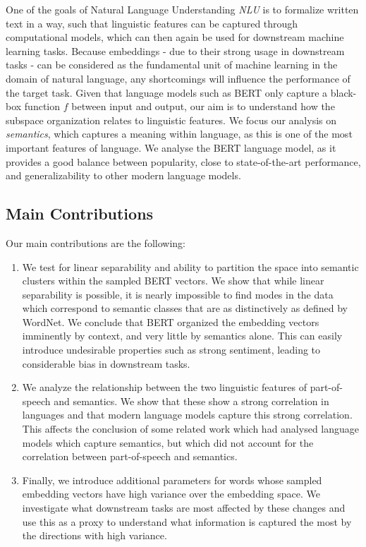 \documentclass[a4paper,12pt,twoside,openright]{report}
\begin{document}
One of the goals of Natural Language Understanding \textit{NLU} is to formalize written text in a way, such that linguistic features can be captured through computational models, which can then again be used for downstream machine learning tasks.
Because embeddings - due to their strong usage in downstream tasks - can be considered as the fundamental unit of machine learning in the domain of natural language, any shortcomings will influence the performance of the target task.
Given that language models such as BERT only capture a black-box function $f$ between input and output, our aim is to understand how the subspace organization relates to linguistic features.
We focus our analysis on \textit{semantics}, which captures a meaning within language, as this is one of the most important features of language. 
We analyse the BERT language model, as it provides a good balance between popularity, close to state-of-the-art performance, and generalizability to other modern language models.
\\

\subsection{Main Contributions}

Our main contributions are the following: 

\begin{enumerate}
\item We test for linear separability and ability to partition the space into semantic clusters within the sampled BERT vectors.
We show that while linear separability is possible, it is nearly impossible to find modes in the data which correspond to semantic classes that are as distinctively as defined by WordNet.
We conclude that BERT organized the embedding vectors imminently by context, and very little by semantics alone.
This can easily introduce undesirable properties such as strong sentiment, leading to considerable bias in downstream tasks.
\item We analyze the relationship between the two linguistic features of part-of-speech and semantics. 
We show that these show a strong correlation in languages and that modern language models capture this strong correlation.
This affects the conclusion of some related work which had analysed language models which capture semantics, but which did not account for the correlation between part-of-speech and semantics.
\item Finally, we introduce additional parameters for words whose sampled embedding vectors have high variance over the embedding space.
We investigate what downstream tasks are most affected by these changes and use this as a proxy to understand what information is captured the most by the directions with high variance. 
\end{enumerate}
\end{document}
